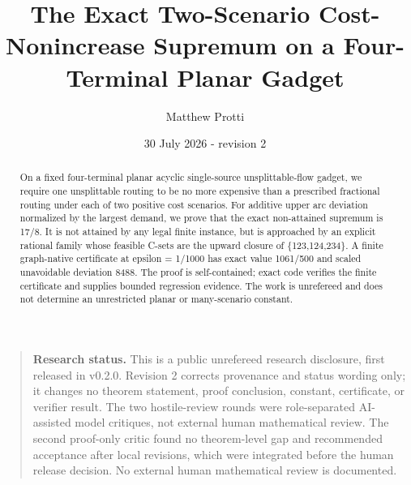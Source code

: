 \documentclass[
  11pt,
]{article}
\title{The Exact Two-Scenario Cost-Nonincrease Supremum on a
Four-Terminal Planar Gadget}
\author{Matthew Protti}
\date{30 July 2026 - revision 2}
\begin{document}
\maketitle
\begin{abstract}
On a fixed four-terminal planar acyclic single-source unsplittable-flow
gadget, we require one unsplittable routing to be no more expensive than
a prescribed fractional routing under each of two positive cost
scenarios. For additive upper arc deviation normalized by the largest
demand, we prove that the exact non-attained supremum is 17/8. It is not
attained by any legal finite instance, but is approached by an explicit
rational family whose feasible C-sets are the upward closure of
\{123,124,234\}. A finite graph-native certificate at epsilon = 1/1000
has exact value 1061/500 and scaled unavoidable deviation 8488. The
proof is self-contained; exact code verifies the finite certificate and
supplies bounded regression evidence. The work is unrefereed and does
not determine an unrestricted planar or many-scenario constant.
\end{abstract}
\begin{center}
\end{center}

{
\setcounter{tocdepth}{3}
\tableofcontents
}
\begin{quote}
\textbf{Research status.} This is a public unrefereed research
disclosure, first released in v0.2.0. Revision 2 corrects provenance and
status wording only; it changes no theorem statement, proof conclusion,
constant, certificate, or verifier result. The two hostile-review rounds
were role-separated AI-assisted model critiques, not external human
mathematical review. The second proof-only critic found no theorem-level
gap and recommended acceptance after local revisions, which were
integrated before the human release decision. No external human
mathematical review is documented.
\end{quote}
\end{document}
